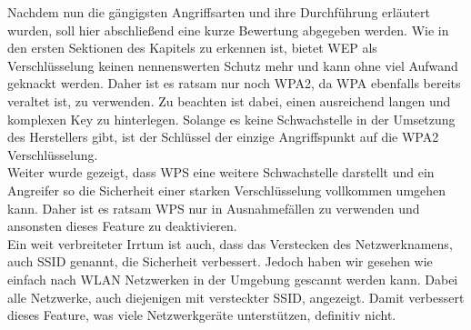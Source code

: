 Nachdem nun die gängigsten Angriffsarten und ihre Durchführung erläutert wurden, soll hier abschließend eine kurze Bewertung abgegeben werden. Wie in den ersten Sektionen des Kapitels zu erkennen ist, bietet WEP als Verschlüsselung keinen nennenswerten Schutz mehr und kann ohne viel Aufwand geknackt werden. Daher ist es ratsam nur noch WPA2, da WPA ebenfalls bereits veraltet ist, zu verwenden. Zu beachten ist dabei, einen ausreichend langen und komplexen Key zu hinterlegen. Solange es keine Schwachstelle in der Umsetzung des Herstellers gibt, ist der Schlüssel der einzige Angriffspunkt auf die WPA2 Verschlüsselung. \\

Weiter wurde gezeigt, dass WPS eine weitere Schwachstelle darstellt und ein Angreifer so die Sicherheit einer starken Verschlüsselung vollkommen umgehen kann. Daher ist es ratsam WPS nur in Ausnahmefällen zu verwenden und ansonsten dieses Feature zu deaktivieren. \\

Ein weit verbreiteter Irrtum ist auch, dass das Verstecken des Netzwerknamens, auch SSID genannt, die Sicherheit verbessert. Jedoch haben wir gesehen wie einfach nach WLAN Netzwerken in der Umgebung gescannt werden kann. Dabei alle Netzwerke, auch diejenigen mit versteckter SSID, angezeigt. Damit verbessert dieses Feature, was viele Netzwerkgeräte unterstützen, definitiv nicht. 



